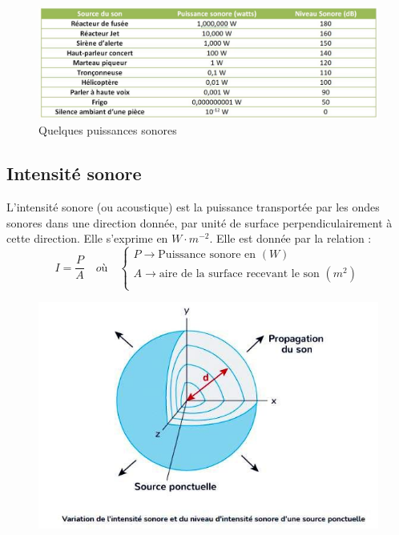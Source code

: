 \documentclass[11pt,a4paper]{article}
\begin{document}
\begin{figure}[h]
    \centering
    \includegraphics[width=\linewidth]{imgs/p5/puissancesonore.jpg}
    \caption{Quelques puissances sonores}
    \label{fig:puissances}
\end{figure}
\subsection{Intensité sonore}

L’intensité sonore (ou acoustique) est la puissance transportée par les ondes sonores dans une direction donnée, par unité de surface perpendiculairement à cette direction. Elle s’exprime en $W\cdot m^{-2}$. Elle est donnée par la relation : 
\[ I = \dfrac{P}{A}\quad où \quad
\begin{cases}
    P \rightarrow \text{Puissance sonore en }(W) \\
    A \rightarrow \text{aire de la surface recevant le son }(m^2) \\ 
\end{cases}
\]
\begingroup
\begin{figure}
  \centering\includegraphics[width=\linewidth]{imgs/p5/sonSphere.jpg}
\end{figure}
\end{document}

